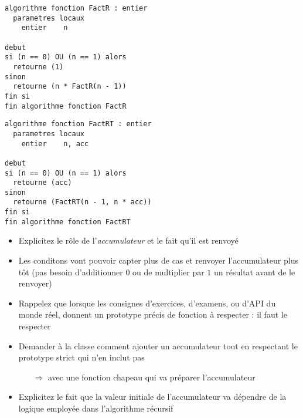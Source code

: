 \documentclass[11pt,a4paper]{article}
\begin{document}

\begin{table}[!ht]
  \centering
  \begin{minipage}{0.475\textwidth}
    \centering
\begin{lstlisting}[style=algorithmique]
algorithme fonction FactR : entier
  parametres locaux
    entier    n

debut
si (n == 0) OU (n == 1) alors
  retourne (1)
sinon
  retourne (n * FactR(n - 1))
fin si
fin algorithme fonction FactR \end{lstlisting}
  \end{minipage}
  \hfillx
  \begin{minipage}{0.48\textwidth}
    \centering
\begin{lstlisting}[style=algorithmique]
algorithme fonction FactRT : entier
  parametres locaux
    entier    n, acc

debut
si (n == 0) OU (n == 1) alors
  retourne (acc)
sinon
  retourne (FactRT(n - 1, n * acc))
fin si
fin algorithme fonction FactRT \end{lstlisting}
  \end{minipage}
\end{table}

\vspace*{-1cm}

\begin{itemize}
\item Explicitez le rôle de l'\textit{accumulateur} et le fait qu'il est renvoyé
\item Les conditons vont pouvoir capter plus de cas et renvoyer l'accumulateur plus tôt (pas besoin d'additionner $ 0 $ ou de multiplier par $ 1 $ un résultat avant de le renvoyer)
\item Rappelez que lorsque les consignes d'exercices, d'examens, ou d'API du monde réel, donnent un prototype précis de fonction à respecter : il faut le respecter
\item Demander à la classe comment ajouter un accumulateur tout en respectant le prototype strict qui n'en inclut pas
  \begin{itemize}
  \item[$\Rightarrow$] avec une fonction chapeau qui va préparer l'accumulateur
  \end{itemize}
\item Explicitez le fait que la valeur initiale de l'accumulateur va dépendre de la logique employée dans l'algorithme récursif
\end{itemize}
\end{document}
